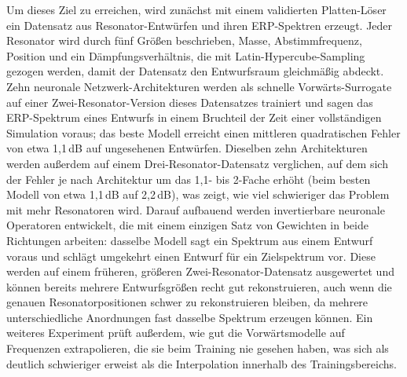 Um dieses Ziel zu erreichen, wird zunächst mit einem validierten Platten-Löser ein Datensatz aus Resonator-Entwürfen und ihren ERP-Spektren erzeugt. Jeder Resonator wird durch fünf Größen beschrieben, Masse, Abstimmfrequenz, Position und ein Dämpfungsverhältnis, die mit Latin-Hypercube-Sampling gezogen werden, damit der Datensatz den Entwurfsraum gleichmäßig abdeckt. Zehn neuronale Netzwerk-Architekturen werden als schnelle Vorwärts-Surrogate auf einer Zwei-Resonator-Version dieses Datensatzes trainiert und sagen das ERP-Spektrum eines Entwurfs in einem Bruchteil der Zeit einer vollständigen Simulation voraus; das beste Modell erreicht einen mittleren quadratischen Fehler von etwa 1,1\,dB auf ungesehenen Entwürfen. Dieselben zehn Architekturen werden außerdem auf einem Drei-Resonator-Datensatz verglichen, auf dem sich der Fehler je nach Architektur um das 1,1- bis 2-Fache erhöht (beim besten Modell von etwa 1,1\,dB auf 2,2\,dB), was zeigt, wie viel schwieriger das Problem mit mehr Resonatoren wird. Darauf aufbauend werden invertierbare neuronale Operatoren entwickelt, die mit einem einzigen Satz von Gewichten in beide Richtungen arbeiten: dasselbe Modell sagt ein Spektrum aus einem Entwurf voraus und schlägt umgekehrt einen Entwurf für ein Zielspektrum vor. Diese werden auf einem früheren, größeren Zwei-Resonator-Datensatz ausgewertet und können bereits mehrere Entwurfsgrößen recht gut rekonstruieren, auch wenn die genauen Resonatorpositionen schwer zu rekonstruieren bleiben, da mehrere unterschiedliche Anordnungen fast dasselbe Spektrum erzeugen können. Ein weiteres Experiment prüft außerdem, wie gut die Vorwärtsmodelle auf Frequenzen extrapolieren, die sie beim Training nie gesehen haben, was sich als deutlich schwieriger erweist als die Interpolation innerhalb des Trainingsbereichs.

\newpage
